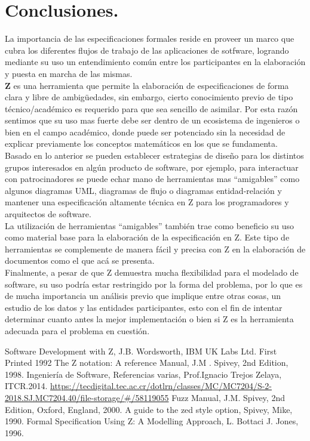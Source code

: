 \documentclass[12pt,a4paper,table]{article}
\begin{document}
\section{Conclusiones.}
La importancia de las especificaciones formales reside en proveer un marco que cubra los diferentes flujos de trabajo de las aplicaciones de sotfware, logrando mediante su uso un entendimiento común entre los participantes en la elaboración y puesta en marcha de las mismas.\\[\baselineskip]
\indent \textbf{Z} es una herramienta que permite la elaboración de especificaciones de forma clara y libre de ambigüedades, sin embargo, cierto conocimiento previo de tipo técnico/académico es requerido para que sea sencillo de asimilar. Por esta razón sentimos que su uso mas fuerte debe ser dentro de un ecosistema de ingenieros o bien en el campo académico, donde puede ser potenciado sin la necesidad de explicar previamente los conceptos matemáticos en los que se fundamenta.\\[\baselineskip]
\indent Basado en lo anterior se pueden establecer estrategias de diseño para los distintos grupos interesados en algún producto de software, por ejemplo, para interactuar con patrocinadores se puede echar mano de herramientas mas ``amigables'' como algunos diagramas UML, diagramas de flujo o diagramas entidad-relación y mantener una especificación altamente técnica en Z para los programadores y arquitectos de software.\\[\baselineskip]
\indent La utilización de herramientas ``amigables'' también trae como beneficio su uso como material base para la elaboración de la especificación en Z. Este tipo de herramientas se complemente de manera fácil y precisa con Z en la elaboración de documentos como el que acá se presenta. \\[\baselineskip]
\indent Finalmente, a pesar de que Z demuestra mucha flexibilidad para el modelado de software, su uso podría estar restringido por la forma del problema, por lo que es de mucha importancia un análisis previo que implique entre otras cosas, un estudio de los datos y las entidades participantes, esto con el fin de intentar determinar cuanto antes la mejor implementación o bien si Z es la herramienta adecuada para el problema en cuestión.

\newpage
\begin{thebibliography}{00}
 Software Development with Z, J.B. Wordsworth, IBM UK Labs Ltd. First Printed 1992
 The Z notation: A reference Manual, J.M . Spivey, 2nd Edition, 1998.
 Ingeniería de Software, Referencias varias, Prof.Ignacio Trejos Zelaya, ITCR.2014. \url{https://tecdigital.tec.ac.cr/dotlrn/classes/MC/MC7204/S-2-2018.SJ.MC7204.40/file-storage/#/58119055}
 Fuzz Manual, J.M. Spivey, 2nd Edition, Oxford, England, 2000.
 A guide to the zed style option, Spivey, Mike, 1990.
 Formal Specification Using Z: A Modelling Approach, L. Bottaci J. Jones, 1996.


\end{thebibliography}
\end{document}
